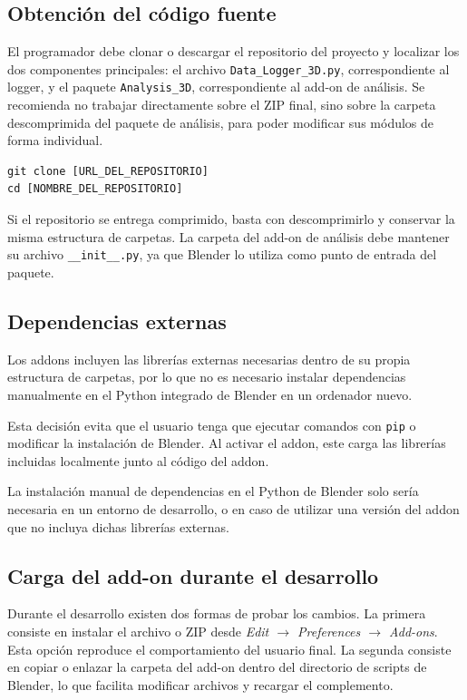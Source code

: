 \subsection{Obtención del código fuente}
\label{subsec:d-obtencion-codigo}

El programador debe clonar o descargar el repositorio del proyecto y localizar los dos componentes principales: el archivo \texttt{Data\_Logger\_3D.py}, correspondiente al logger, y el paquete \texttt{Analysis\_3D}, correspondiente al add-on de análisis. Se recomienda no trabajar directamente sobre el ZIP final, sino sobre la carpeta descomprimida del paquete de análisis, para poder modificar sus módulos de forma individual.

\begin{verbatim}
git clone [URL_DEL_REPOSITORIO]
cd [NOMBRE_DEL_REPOSITORIO]
\end{verbatim}

Si el repositorio se entrega comprimido, basta con descomprimirlo y conservar la misma estructura de carpetas. La carpeta del add-on de análisis debe mantener su archivo \texttt{\_\_init\_\_.py}, ya que Blender lo utiliza como punto de entrada del paquete.

\subsection{Dependencias externas}
\label{subsec:d-dependencias-externas}

Los addons incluyen las librerías externas necesarias dentro de su propia estructura de carpetas, por lo que no es necesario instalar dependencias manualmente en el Python integrado de Blender en un ordenador nuevo.

Esta decisión evita que el usuario tenga que ejecutar comandos con \texttt{pip} o modificar la instalación de Blender. Al activar el addon, este carga las librerías incluidas localmente junto al código del addon.

La instalación manual de dependencias en el Python de Blender solo sería necesaria en un entorno de desarrollo, o en caso de utilizar una versión del addon que no incluya dichas librerías externas.

\subsection{Carga del add-on durante el desarrollo}
\label{subsec:d-carga-desarrollo}

Durante el desarrollo existen dos formas de probar los cambios. La primera consiste en instalar el archivo o ZIP desde \textit{Edit $\rightarrow$ Preferences $\rightarrow$ Add-ons}. Esta opción reproduce el comportamiento del usuario final. La segunda consiste en copiar o enlazar la carpeta del add-on dentro del directorio de scripts de Blender, lo que facilita modificar archivos y recargar el complemento.

